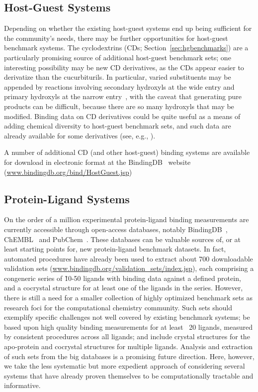 \documentclass[aps,pre,twocolumn,nofootinbib,superscriptaddress,10pt, final,tightenlines]{revtex4-1}
\begin{document}
\subsection{Host-Guest Systems}
Depending on whether the existing host-guest systems end up being sufficient for the community's needs, there may be further opportunities for host-guest benchmark systems. 
The cyclodextrins (CDs; Section~\ref{sec:hgbenchmarks}) are a particularly promising source of additional host-guest benchmark sets; one interesting possibility may be new CD derivatives, as the CDs appear easier to derivatize than the cucurbiturils. 
In particular, varied substituents may be appended by reactions involving secondary hydroxyls at the wide entry and primary hydroxyls at the narrow entry~\cite{Fromming:1994:CyclodextrinsinPharmacy, Dodziuk:2006:, Szente:1999:AdvancedDrugDeliveryReviews, Qu:2002:JournalofInclusionPhenomena, Jindrich:2005:J.Org.Chem.}, with the caveat that generating pure products can be difficult, because there are so many hydroxyls that may be modified. 
Binding data on CD derivatives could be quite useful as a means of adding chemical diversity to host-guest benchmark sets, and such data are already available for some derivatives (see, e.g., \cite{rekharsky_complexation_1998, Faugeras:2012:Eur.J.Org.Chem.}).

A number of additional CD (and other host-guest) binding systems are available for download in electronic format at the BindingDB~\cite{Liu:2007:Nucl.AcidsRes., Gilson:2016:Nucl.AcidsRes.} website (\url{www.bindingdb.org/bind/HostGuest.jsp})

\subsection{Protein-Ligand Systems}
On the order of a million experimental protein-ligand binding measurements are currently accessible through open-access databases, notably BindingDB~\cite{Liu:2007:Nucl.AcidsRes.}, ChEMBL~\cite{Bento:2014:NuclAcidsRes} and PubChem~\cite{Kim:2016:NucleicAcidsRes.}.
These databases can be valuable sources of, or at least starting points for, new protein-ligand benchmark datasets.
In fact, automated procedures have already been used to extract about 700 downloadable validation sets (\url{www.bindingdb.org/validation\_sets/index.jsp}), each
comprising a congeneric series of \~10-50 ligands with binding data against a defined protein, and a cocrystal structure for at least one of the ligands in the series.
However, there is still a need for a smaller collection of highly optimized benchmark sets as research foci for the computational chemistry community.
Such sets should exemplify specific challenges not well covered by existing benchmark systems; be based upon high quality binding measurements for at least ~20 ligands, measured by consistent procedures across all ligands; and include crystal structures for the apo-protein and cocrystal structures for multiple ligands.
Analysis and extraction of such sets from the big databases is a promising future direction.
Here, however, we take the less systematic but more expedient approach of considering several systems that have already proven themselves to be computationally tractable and informative.
\end{document}
